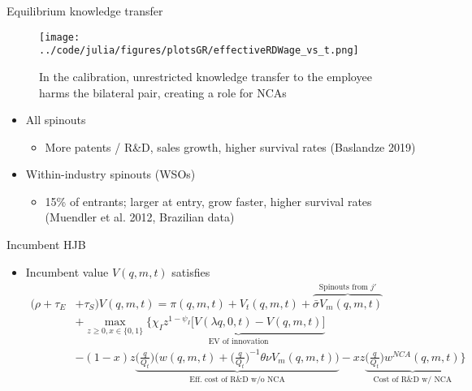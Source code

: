 \documentclass[english,usenames,dvipsnames]{beamer}
\begin{document}
\begin{frame}{Equilibrium knowledge transfer}
\begin{figure}
	\texttt{[image: ../code/julia/figures/plotsGR/effectiveRDWage\_vs\_t.png]}
	\caption{In the calibration, unrestricted knowledge transfer to the employee harms the bilateral pair, creating a role for NCAs}
\end{figure}
\end{frame}



\appendix



\begin{frame}\label{spinouts_facts_from_literature}
\hyperlink{motivation_spillovers}{}
\begin{itemize}
	\item All spinouts
	\begin{itemize}
		\item More patents / R\&D, sales growth, higher survival rates (Baslandze 2019) 
	\end{itemize}
	\item Within-industry spinouts (WSOs)
	\begin{itemize}
		\item 15\% of entrants; larger at entry, grow faster, higher survival rates (Muendler et al. 2012, Brazilian data)
	\end{itemize}
\end{itemize}
\end{frame}


\begin{frame}{Incumbent HJB}\label{HJB_incumbent}
\hyperlink{closing_the_model}{}
\begin{itemize}
	\item Incumbent value $V(q,m,t)$ satisfies
	\tiny
	\begin{align*}
	(\rho + \tau_E& + \tau_S) V(q,m,t) = \pi(q,m,t) + V_t(q,m,t) + \overbrace{\bar{\sigma}V_m(q,m,t)}^{\textrm{Spinouts from $j'$}}  \nonumber \\ 
	&+ \max_{z \ge 0, x\in \{0,1\}} \Big\{ \underbrace{\chi_I z^{1-\psi_I} \Big[V(\lambda q,0,t) - V(q,m,t) \Big]}_{\textrm{EV of innovation}} \\
	&-(1-x) z \underbrace{\Big(\frac{q}{Q_t}\Big) \Big(  w(q,m,t) + \Big(\frac{q}{Q_t}\Big)^{-1} \theta \nu V_m(q,m,t) \Big)}_{\textrm{Eff. cost of R\&D w/o NCA}} - xz \underbrace{\Big( \frac{q}{Q_t} \Big) w^{NCA}(q,m,t)}_{\textrm{Cost of R\&D w/ NCA}} \Big\} 
	\end{align*}
\end{itemize}
\end{frame}
\end{document}
